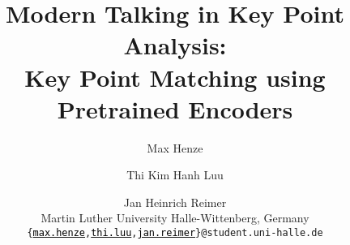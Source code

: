 \documentclass[11pt]{article}
\title{%
  Modern Talking in Key Point Analysis: \\
  Key Point Matching using Pretrained Encoders%
}
\author{%
  Max Henze \and Thi Kim Hanh Luu \and Jan Heinrich Reimer \\
  Martin Luther University Halle-Wittenberg, Germany \\ 
  \texttt{\{\href{mailto:max.henze@student.uni-halle.de}{\textcolor{black}{max.henze}},\href{mailto:thi.luu@student.uni-halle.de}{\textcolor{black}{thi.luu}},\href{mailto:jan.reimer@student.uni-halle.de}{\textcolor{black}{jan.reimer}}\}@student.uni-halle.de}%
}
\begin{document}
\maketitle

\begin{abstract}
  
\end{abstract}











\appendix


\end{document}
